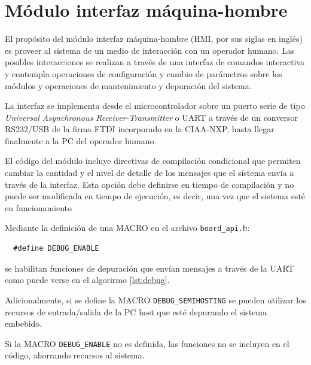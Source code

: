 \section{Módulo interfaz máquina-hombre}
\label{sec:HMI}

El propósito del módulo interfaz máquina-hombre (HMI, por sus siglas en inglés) es proveer al sistema de un medio de interacción con un operador humano. Las posibles interacciones se realizan a través de una interfaz de comandos interactiva y contempla operaciones de configuración y cambio de parámetros sobre los módulos y operaciones de mantenimiento y depuración del sistema.  

La interfaz se implementa desde el microcontrolador sobre un puerto serie de tipo \textit{Universal Asynchronous Receiver-Transmitter} o UART a través de un conversor RS232/USB de la firma FTDI incorporado en la CIAA-NXP, hasta llegar finalmente a la PC del operador humano.

El código del módulo incluye directivas de compilación condicional que permiten cambiar la cantidad y el nivel de detalle de los mensajes que el sistema envía a través de la interfaz.  Esta opción debe definirse en tiempo de compilación y no puede ser modificada en tiempo de ejecución, es decir, una vez que el sistema esté en funcionamiento  

Mediante la definición de una MACRO en el archivo \texttt{board\_api.h}:
\begin{verbatim}
  #define DEBUG_ENABLE
\end{verbatim}

\noindent se habilitan funciones de depuración que envían mensajes a través de la UART como puede verse en el algorirmo \ref{lst:debug}.  

Adicionalmente, si se define la MACRO \texttt{DEBUG\_SEMIHOSTING} se pueden utilizar los recursos de entrada/salida de la PC host que esté depurando el sistema embebido. 

Si la MACRO \texttt{DEBUG\_ENABLE} no es definida, las funciones no se incluyen en el código, ahorrando recursos al sistema.

\vspace{10px}

